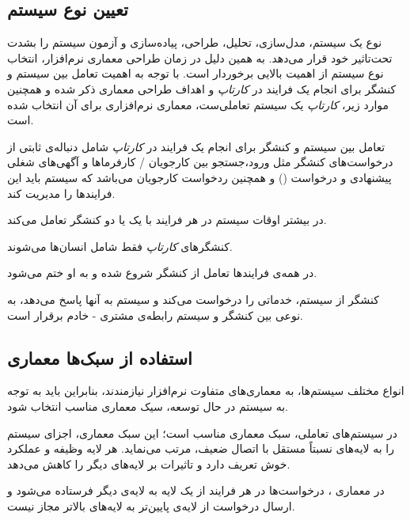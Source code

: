 \documentclass[12pt,svgnames,oneside]{book}
\newcounter{itemadded}
\let\LaTeXStandardEnumerateBegin\enumerate
\let\LaTeXStandardEnumerateEnd\endenumerate
\renewenvironment{enumerate}{%
\LaTeXStandardEnumerateBegin%
\setcounter{itemadded}{0}
}{%
\LaTeXStandardEnumerateEnd%
}%
\begin{document}
\subsection{تعیین نوع سیستم}
نوع یک سیستم، مدل‌سازی، تحلیل، طراحی، پیاده‌سازی و آزمون سیستم را بشدت تحت‌تاثیر خود قرار می‌دهد. به همین دلیل در زمان طراحی معماری نرم‌افزار، انتخاب نوع سیستم از اهمیت بالایی برخوردار است. با توجه به اهمیت تعامل بین سیستم و کنشگر برای انجام یک فرایند در \textit{کارتاپ} و اهداف طراحی معماری ذکر شده و همچنین موارد زیر، \textit{کارتاپ} یک سیستم تعاملی‌ست، معماری نرم‌افزاری  برای آن انتخاب شده است.


\begin{enumerate}
\item		
تعامل بین سیستم و کنشگر برای انجام یک فرایند در \textit{کارتاپ} شامل دنباله‌ی ثابتی از درخواست‌های کنشگر مثل ورود،‌جستجو بین کارجویان / کارفرما‌ها و آگهی‌های شغلی پیشنهادی و درخواست () و همچنین ردخواست کارجویان می‌باشد که سیستم باید این فرایند‌ها را مدیریت کند.

\item 					
در بیشتر اوقات سیستم در هر فرایند با یک یا دو کنشگر تعامل می‌کند.

\item 					
کنشگر‌های \textit{کارتاپ} فقط شامل انسان‌ها می‌شوند.

\item 				
در همه‌ی فرایند‌ها تعامل از کنشگر شروع شده و به او ختم می‌شود.

\item 
کنشگر از سیستم،‌ خدماتی را درخواست می‌کند و سیستم به آنها پاسخ می‌دهد، به نوعی بین کنشگر و سیستم رابطه‌ی مشتری - خادم برقرار است.

\end{enumerate}

\subsection{استفاده از سبک‌ها معماری}
انواع مختلف سیستم‌‌ها، به معماری‌های متفاوت نرم‌افزار نیازمندند، بنابراین باید به توجه به سیستم در حال توسعه، سیک معماری مناسب انتخاب شود.

در سیستم‌های تعاملی، سبک معماری  مناسب است؛ این سبک معماری، اجزای سیستم را به لایه‌های  نسبتاً مستقل با اتصال ضعیف، مرتب می‌نماید. هر لایه وظیفه و عملکرد خوش تعریف دارد و تاثیرات بر لایه‌های دیگر را کاهش می‌دهد.

در معماری ،‌ درخواست‌ها در هر فرایند از یک لایه به لایه‌ی دیگر فرستاده می‌شود و ارسال درخواست از لایه‌ی پایین‌تر به لایه‌های بالاتر مجاز نیست.
\end{document}
